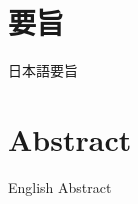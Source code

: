 \begin{center}
    \titleja
\end{center}

\section*{要旨}
日本語要旨

\newpage

\begin{center}
    \titleen
\end{center}

\section*{Abstract}
English Abstract

\newpage